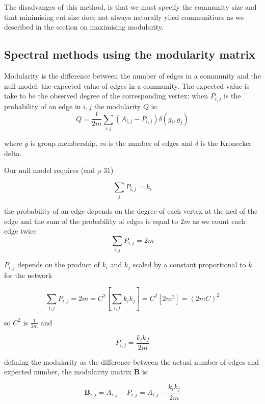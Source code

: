 The disadvanges of this method, is that we must specify the community size and that minimising cut size does not always naturally yiled communitiues as we described in the section on maximising modularity.

\subsection{Spectral methods using the modularity matrix}

Modularity is the difference between the number of edges in a community and the null model: the expected value of edges in a community. The expected value is take to be the observed degree of the corresponding vertex: when $P_{i,j}$ is the probability of an edge in $i,j$ the modularity $Q$ is:
\begin{equation}
Q = \frac{1}{2m} \sum_{i,j} (A_{i,j}-P_{i,j})\delta(g_i,g_j)
\end{equation}

where $g$ is group membership, $m$ is the number of edges and $\delta$ is the Kronecker delta.

Our null model requires (end p 31)

\begin{equation}
\sum_j P_{i,j}=k_i	
\end{equation}

the probability of an edge depends on the degree of each vertex at the ned of the edge and the sum of the probability of edges is equal to $2m$ as we count each edge twice
\begin{equation}
	\sum_{i,j} P_{i,j}=2m
\end{equation}

$P_{i,j}$ depends on the product of $k_i$ and $k_j$ scaled by a constant proportional to $k$ for the network

\begin{equation}
	\sum_{i,j}P_{i,j}=2m=C^2[\sum_{i,j} k_i k_j] = C^2[2m^2]=(2mC)^2
\end{equation} 

so $C^2$ is $\frac{1}{2m}$ and

\begin{equation}
	P_{i,j} = \frac{k_i k_J}{2m}
\end{equation}

defining the modularity as the difference between the actual number of edges and expected number, the modularity matrix $\mathbf{B}$ is:

\begin{equation}
\mathbf{B}_{i,j} = A_{i,j} - P_{i,j} = A_{i,j} - \frac{k_i k_j}{2m}
\end{equation}
\label{eq:modularity matrix B}

